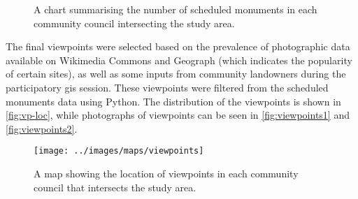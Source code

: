 \begin{figure}
  \centering
  \caption{A chart summarising the number of scheduled monuments in each community council intersecting the study area. \label{fig:sm-cc}}
\end{figure}

The final viewpoints were selected based on the prevalence of photographic data available on Wikimedia Commons and Geograph \autocite{wikimedia,geograph-uk} (which indicates the popularity of certain sites), as well as some inputs from community landowners during the participatory \gls{gis} session. These viewpoints were filtered from the scheduled monuments data using Python. The distribution of the viewpoints is shown in \autoref{fig:vp-loc}, while photographs of viewpoints can be seen in \autoref{fig:viewpoints1} and \autoref{fig:viewpoints2}.

\begin{figure}
  \centering
  \texttt{[image: ../images/maps/viewpoints]}
  \caption{A map showing the location of viewpoints in each community council that intersects the study area. \label{fig:vp-loc}}
\end{figure}

